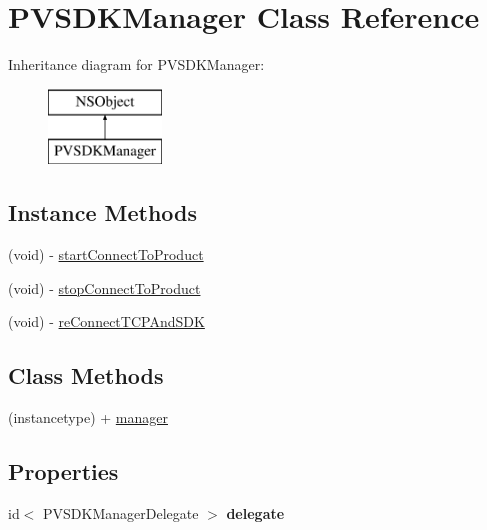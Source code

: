 \hypertarget{interface_p_v_s_d_k_manager}{}\section{P\+V\+S\+D\+K\+Manager Class Reference}
\label{interface_p_v_s_d_k_manager}
Inheritance diagram for P\+V\+S\+D\+K\+Manager\+:\begin{figure}[H]
\begin{center}
\leavevmode
\includegraphics[height=2.000000cm]{interface_p_v_s_d_k_manager}
\end{center}
\end{figure}
\subsection*{Instance Methods}
\begin{DoxyCompactItemize}
\item 
(void) -\/ \hyperlink{interface_p_v_s_d_k_manager_ac75f53348d189816b4435e8e4b8d54d2}{start\+Connect\+To\+Product}
\item 
(void) -\/ \hyperlink{interface_p_v_s_d_k_manager_aedc4680e8cdc972b69dca0d0cdb6f019}{stop\+Connect\+To\+Product}
\item 
(void) -\/ \hyperlink{interface_p_v_s_d_k_manager_a2ece0b5495ce9b1ede618a5742da6f2f}{re\+Connect\+T\+C\+P\+And\+S\+DK}
\end{DoxyCompactItemize}
\subsection*{Class Methods}
\begin{DoxyCompactItemize}
\item 
(instancetype) + \hyperlink{interface_p_v_s_d_k_manager_ad4f2c7d08eef0498c02bf13acbc80fcd}{manager}
\end{DoxyCompactItemize}
\subsection*{Properties}
\begin{DoxyCompactItemize}
\item 
\mbox{\label{interface_p_v_s_d_k_manager_ab7a3cb03dfa59f012212e7c56a8ccbbd}} 
id$<$ P\+V\+S\+D\+K\+Manager\+Delegate $>$ {\bfseries delegate}
\end{DoxyCompactItemize}


